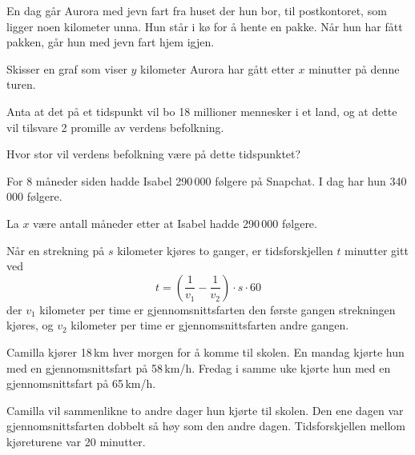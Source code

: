 En dag går Aurora med jevn fart fra huset der hun bor, til postkontoret, som ligger
noen kilometer unna. Hun står i kø for å hente en pakke. Når hun har fått pakken, går
hun med jevn fart hjem igjen. \os

Skisser en graf som viser $y$ kilometer Aurora har gått etter $x$ minutter på denne turen.


Anta at det på et tidspunkt vil bo 18 millioner mennesker i et land, og at dette vil
tilsvare 2 promille av verdens befolkning. \os

Hvor stor vil verdens befolkning være på dette tidspunktet?

For 8 måneder siden hadde Isabel 290\,000 følgere på Snapchat. I dag har hun
340\,000 følgere. \os

La $x$ være antall måneder etter at Isabel hadde 290\,000 følgere.

Når en strekning på $s$ kilometer kjøres to ganger, er tidsforskjellen
$t$ minutter gitt ved
\[
t = \left( \frac{1}{v_1} - \frac{1}{v_2} \right) \cdot s \cdot 60
\]
der $v_1$ kilometer per time er gjennomsnittsfarten den første gangen
strekningen kjøres, og $v_2$ kilometer per time er gjennomsnittsfarten
andre gangen.\os

Camilla kjører 18\,km hver morgen for å komme til skolen. En mandag
kjørte hun med en gjennomsnittsfart på 58\,km/h. Fredag i samme uke
kjørte hun med en gjennomsnittsfart på 65\,km/h.


Camilla vil sammenlikne to andre dager hun kjørte til skolen. Den ene
dagen var gjennomsnittsfarten dobbelt så høy som den andre dagen.
Tidsforskjellen mellom kjøreturene var 20 minutter.



